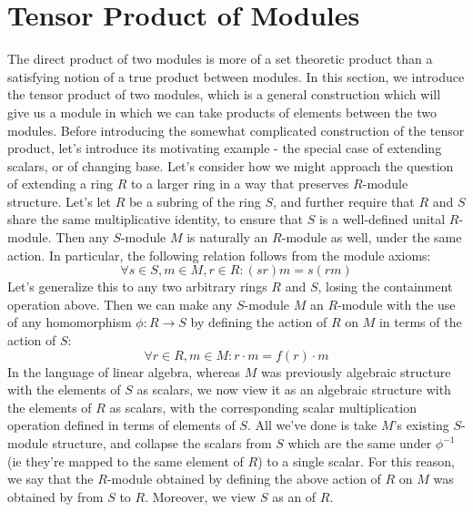 \documentclass{article}
\begin{document}
\section{Tensor Product of Modules}
The direct product of two modules is more of a set theoretic product than a satisfying notion of a true product between modules. In this section, we introduce the tensor product of two modules, which is a general construction which will give us a module in which we can take products of elements between the two modules. Before introducing the somewhat complicated construction of the tensor product, let's introduce its motivating example - the special case of extending scalars, or of changing base.
\n
Let's consider how we might approach the question of extending a ring $ R $ to a larger ring in a way that preserves $ R $-module structure. Let's let $ R $ be a subring of the ring $ S $, and further require that $ R $ and $ S $ share the same multiplicative identity, to ensure that $ S $ is a well-defined unital $ R $-module. Then any $ S $-module $ M $ is naturally an $ R $-module as well, under the same action. In particular, the following relation follows from the module axioms:
$$ \forall s \in S, m \in M, r \in R: (s r) m = s (r m) $$
Let's generalize this to any two arbitrary rings $ R $ and $ S $, losing the containment operation above. Then we can make any $ S $-module $ M $ an $ R $-module with the use of any homomorphism $ \phi: R \rightarrow S $ by defining the action of $ R $ on $ M $ in terms of the action of $ S $:
$$ \forall r \in R, m \in M: r \cdot m = f(r) \cdot m $$
In the language of linear algebra, whereas $ M $ was previously algebraic structure with the elements of $ S $ as scalars, we now view it as an algebraic structure with the elements of $ R $ as scalars, with the corresponding scalar multiplication operation defined in terms of elements of $ S $. All we've done is take $ M $'s existing $ S $-module structure, and collapse the scalars from $ S $ which are the same under $ \phi^{-1} $ (ie they're mapped to the same element of $ R $) to a single scalar. For this reason, we say that the $ R $-module obtained by defining the above action of $ R $ on $ M $ was obtained by  from $ S $ to $ R $. Moreover, we view $ S $ as an  of $ R $.
\nn
\end{document}

